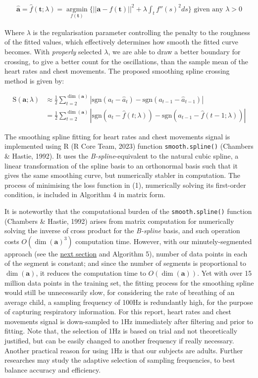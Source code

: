 \documentclass[
]{article}
\begin{document}
\begin{align}
  \mathbf{\hat{a}} = \hat{f}(\mathbf{t} ; \lambda) = \mathop{\arg\min}\limits_{f(\mathbf{t})} \Bigr\{||\mathbf{a} - f(\mathbf{t})||^2 + \lambda\int_t f''(s)^2ds\Bigr\} \text{ given any } \lambda > 0
\end{align}

Where \(\lambda\) is the regularisation parameter controlling the
penalty to the roughness of the fitted values, which effectively
determines how smooth the fitted curve becomes. With \emph{properly}
selected \(\lambda\), we are able to draw a better boundary for
crossing, to give a better count for the oscillations, than the sample
mean of the heart rates and chest movements. The proposed smoothing
spline crossing method is given by:

\begin{align*}
  \text{S}(\mathbf{a} ; \lambda) &\approx \frac{1}{2} \sum_{t = 2}^{\dim(\mathbf{a})} |\text{sgn}(a_t - \hat{a}_t) - \text{sgn}(a_{t - 1} - \hat{a}_{t - 1})| \\
  &= \frac{1}{2} \sum_{t = 2}^{\dim(\mathbf{a})} |\text{sgn}(a_t - \hat{f}(t ; \lambda)) - \text{sgn}(a_{t - 1} - \hat{f}(t - 1 ; \lambda))|
\end{align*}

The smoothing spline fitting for heart rates and chest movements signal
is implemented using R (R Core Team, 2023) function
\texttt{smooth.spline()} (Chambers \& Hastie, 1992). It uses the
\emph{B-spline}-equivalent to the natural cubic spline, a linear
transformation of the spline basis to an orthonormal basis such that it
gives the same smoothing curve, but numerically stabler in computation.
The process of minimising the loss function in (1), numerically solving
its first-order condition, is included in Algorithm 4 in matrix form.

It is noteworthy that the computational burden of the
\texttt{smooth.spline()} function (Chambers \& Hastie, 1992) arises from
matrix computation for numerically solving the inverse of cross product
for the \emph{B-spline} basis, and such operation costs
\(O(\dim(\mathbf{a})^3)\) computation time. However, with our
minutely-segmented approach (see the \protect\hyperlink{mod-train}{next
section} and Algorithm 5), number of data points in each of the segment
is constant; and since the number of segments is proportional to
\(\dim(\mathbf{a})\), it reduces the computation time to
\(O(\dim(\mathbf{a}))\). Yet with over 15 million data points in the
training set, the fitting process for the smoothing spline would still
be unnecessarily slow, for considering the rate of breathing of an
average child, a sampling frequency of 100Hz is redundantly high, for
the purpose of capturing respiratory information. For this report, heart
rates and chest movements signal is down-sampled to 1Hz immediately
after filtering and prior to fitting. Note that, the selection of 1Hz is
based on trial and not theoretically justified, but can be easily
changed to another frequency if really necessary. Another practical
reason for using 1Hz is that our subjects are adults. Further researches
may study the adaptive selection of sampling frequencies, to best
balance accuracy and efficiency.
\end{document}
